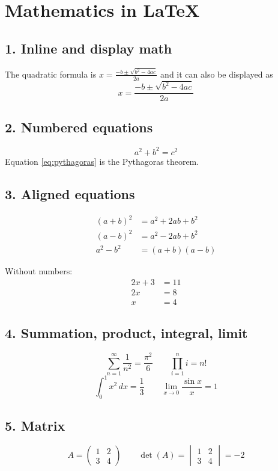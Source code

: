 \documentclass[12pt]{article}
\begin{document}
\section*{Mathematics in \LaTeX{}}

\subsection*{1. Inline and display math}
The quadratic formula is $x = \frac{-b \pm \sqrt{b^2-4ac}}{2a}$ and it can also be displayed as
\[
x = \frac{-b \pm \sqrt{b^2-4ac}}{2a}
\]

\subsection*{2. Numbered equations}
\begin{equation}
a^2 + b^2 = c^2 \label{eq:pythagoras}
\end{equation}
Equation \eqref{eq:pythagoras} is the Pythagoras theorem.

\subsection*{3. Aligned equations}
\begin{align}
(a+b)^2 &= a^2 + 2ab + b^2 \\
(a-b)^2 &= a^2 - 2ab + b^2 \\
a^2 - b^2 &= (a+b)(a-b)
\end{align}

Without numbers:
\begin{align*}
2x + 3 &= 11 \\
2x &= 8 \\
x &= 4
\end{align*}

\subsection*{4. Summation, product, integral, limit}
\[
\sum_{n=1}^{\infty} \frac{1}{n^2} = \frac{\pi^2}{6}
\qquad
\prod_{i=1}^{n} i = n!
\]
\[
\int_{0}^{1} x^2 \, dx = \frac{1}{3}
\qquad
\lim_{x \to 0} \frac{\sin x}{x} = 1
\]

\subsection*{5. Matrix}
\[
A = \begin{pmatrix} 1 & 2 \\ 3 & 4 \end{pmatrix}
\qquad
\det(A) = \begin{vmatrix} 1 & 2 \\ 3 & 4 \end{vmatrix} = -2
\]
\end{document}

